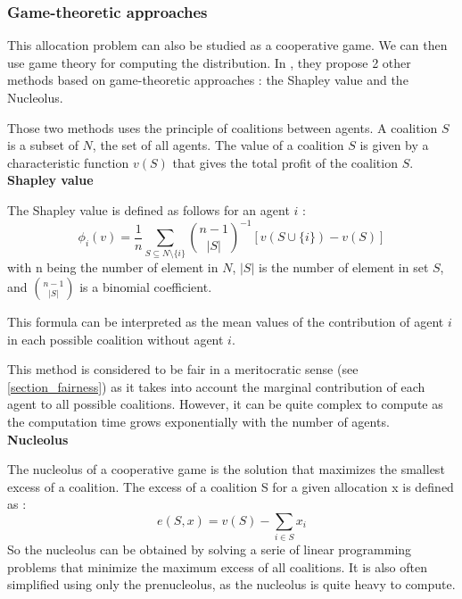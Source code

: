 \subsubsection{Game-theoretic approaches}

This allocation problem can also be studied as a cooperative game. We can then use game theory for computing the distribution. In \cite{article_1,these_sorel}, they propose 2 other methods based on game-theoretic approaches : the Shapley value and the Nucleolus. 

Those two methods uses the principle of coalitions between agents. A coalition $S$ is a subset of $N$, the set of all agents. The value of a coalition $S$ is given by a characteristic function $v(S)$ that gives the total profit of the coalition $S$. \\

\noindent\textbf{Shapley value}

The Shapley value \cite{article_1,these_sorel} is defined as follows for an agent $i$ :
\begin{equation}
    \phi_i (v) = \frac{1}{n}\sum_{S \subseteq N \setminus \{i\}}{\binom{n-1}{|S|}^{-1} [v(S \cup \{i\}) - v(S)]} \label{eq:shapley}
\end{equation}
with n being the number of element in $N$, $|S|$ is the number of element in set $S$, and $\binom{n-1}{|S|}$ is a binomial coefficient.

This formula can be interpreted as the mean values of the contribution of agent $i$ in each possible coalition without agent $i$.

This method is considered to be fair in a meritocratic sense (see \ref{section_fairness}) as it takes into account the marginal contribution of each agent to all possible coalitions. However, it can be quite complex to compute as the computation time grows exponentially with the number of agents.\\

\noindent\textbf{Nucleolus}

The nucleolus \cite{article_1,these_sorel} of a cooperative game is the solution that maximizes the smallest excess of a coalition. The excess of a coalition S for a given allocation x is defined as :
\begin{equation}
    e(S,x) = v(S) - \sum_{i \in S}{x_i} 
\end{equation}
So the nucleolus can be obtained by solving a serie of linear programming problems that minimize the maximum excess of all coalitions. It is also often simplified using only the prenucleolus, as the nucleolus is quite heavy to compute.

